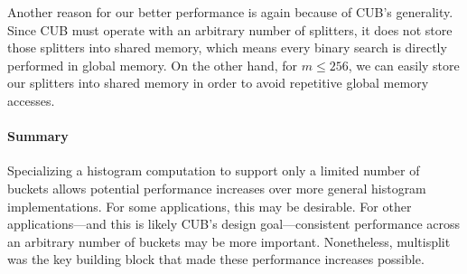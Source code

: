 Another reason for our better performance is again because of CUB's generality. Since CUB must operate with an arbitrary number of splitters, it does not store those splitters into shared memory, which means every binary search is directly performed in global memory. On the other hand, for $m \leq 256$, we can easily store our splitters into shared memory in order to avoid repetitive global memory accesses.
%

\paragraph{Summary} Specializing a histogram computation to support only a limited number of buckets allows potential performance increases over more general histogram implementations. For some applications, this may be desirable. For other applications---and this is likely CUB's design goal---consistent performance across an arbitrary number of buckets may be more important. Nonetheless, multisplit was the key building block that made these performance increases possible.
